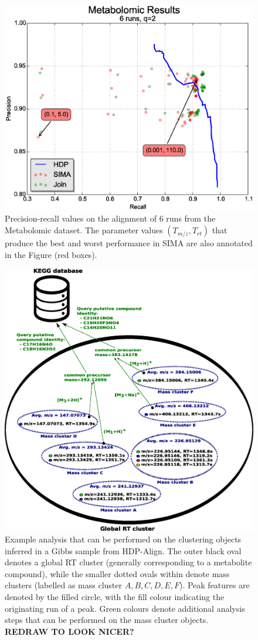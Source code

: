 \begin{figure}[!htbp]
\centering\includegraphics[width=0.7\linewidth]{05-hdp/figures/figure_6.eps}
\centering\caption{\label{fig:metabolomic_results_alignment}Precision-recall values on the alignment of 6 runs from the Metabolomic dataset. The parameter values $(T_{m/z}, T_{rt})$ that produce the best and worst performance in SIMA are also annotated in the Figure (red boxes).}
\end{figure}

\begin{figure}[!htbp]
\centering\includegraphics[width=0.7\linewidth]{05-hdp/figures/figure_7.eps}
\centering\caption{\label{fig:metabolomic_results_annotations}Example analysis that can be performed on the clustering objects inferred in a Gibbs sample from HDP-Align. The outer black oval denotes a global RT cluster (generally corresponding to a metabolite compound), while the smaller dotted ovals within denote mass clusters (labelled as mass cluster $A,B,C,D,E,F$). Peak features are denoted by the filled circle, with the fill colour indicating the originating run of a peak. Green colours denote additional analysis steps that can be performed on the mass cluster objects. \textbf{REDRAW TO LOOK NICER?}}
\end{figure}

